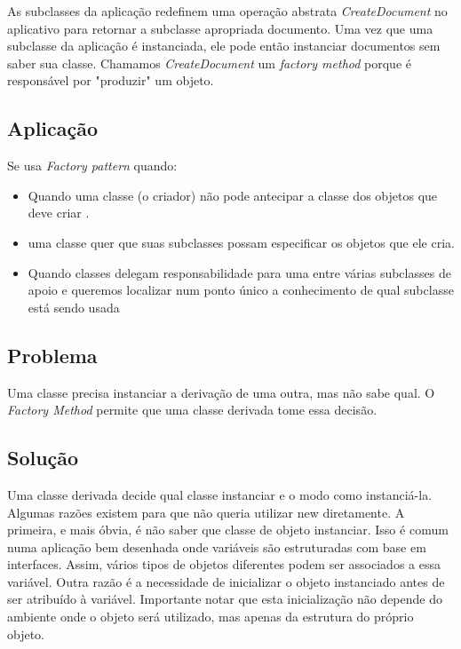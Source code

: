 As subclasses da aplicação redefinem uma operação abstrata \emph{CreateDocument} no 
aplicativo para retornar a subclasse apropriada documento. Uma vez que uma subclasse da aplicação é instanciada, ele pode então instanciar documentos sem saber sua classe. Chamamos \emph{CreateDocument} um \emph{factory method} porque é
responsável por "produzir" um objeto.\cite{gamma95}

\subsection{Aplicação}
\label{sub:fac_aplica}

Se usa \emph{Factory pattern} quando:\cite{gamma95}

\begin{itemize}
	\item Quando uma classe (o criador) não pode antecipar a classe dos objetos que deve criar
.	\item uma classe quer que suas subclasses possam especificar os objetos que ele cria.
	\item Quando classes delegam responsabilidade para uma entre várias subclasses de apoio e
queremos localizar num ponto único a conhecimento de qual subclasse está sendo usada

\end{itemize}


\subsection{Problema}
\label{sub:fac_problema}

Uma classe precisa instanciar a derivação de uma outra, mas não sabe qual. O \emph{Factory Method} permite que uma classe derivada tome essa decisão.

\subsection{Solução}
\label{sub:fac_solucao}

Uma classe derivada decide qual classe instanciar e o modo como instanciá-la.
Algumas razões existem para que não queria utilizar new diretamente. A primeira, e
mais óbvia, é não saber que classe de objeto instanciar.
Isso é comum numa aplicação bem desenhada onde variáveis são estruturadas com
base em interfaces. Assim, vários tipos de objetos diferentes podem ser associados a
essa variável. Outra razão é a necessidade de inicializar o objeto instanciado antes de ser
atribuído à variável. Importante notar
que esta inicialização não depende do ambiente onde o objeto será utilizado, mas apenas
da estrutura do próprio objeto.\cite{fact1}\cite{gamma95}



